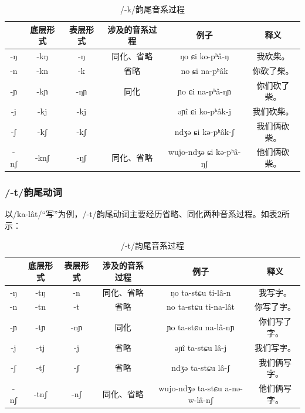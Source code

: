 \begin{table}[H]
\vspace{5pt}
    \centering
    \caption{/-k/韵尾音系过程}
    \label{kcodapro}
\begin{tabular}{c|ccccc}
\toprule
    & 底层形式 & 表层形式 & 涉及的音系过程 & 例子                      & 释义     \\
\midrule
-ŋ  & -kŋ     & -ŋ   & 同化、省略      & ŋo ɕi ko-pʰâ-ŋ         & 我砍柴。   \\
-n  & -kn     & -k   & 省略      & no ɕi na-pʰâk          & 你砍了柴。  \\
-ɲ  & -kɲ     & -ŋɲ  & 同化      & ɲo ɕi na-pʰâ-ŋɲ        & 你们砍了柴。 \\
-j  & -kj     & -kj  &         & əɲî ɕi ko-pʰâk-j      & 我们砍柴。  \\
-ʃ  & -kʃ     & -kʃ  &         & ndʒə ɕi kə-pʰâk-ʃ      & 我们俩砍柴。 \\
-nʃ & -knʃ    & -ŋʃ  & 同化、省略      & wujo-ndʒə ɕi kə-pʰâ-ŋʃ & 他们俩砍柴。\\
\bottomrule
\end{tabular}
\end{table}

\subsubsection{/-t/韵尾动词}

以/ka-lât/“写”为例，/-t/韵尾动词主要经历省略、同化两种音系过程。如表\ref{tcodapro}所示：

\begin{table}[H]
\vspace{5pt}
    \centering
    \caption{/-t/韵尾音系过程}
    \label{tcodapro}
\begin{tabular}{c|ccccc}
\toprule
    & 底层形式 & 表层形式 & 涉及的音系过程 & 例子                      & 释义     \\
\midrule
-ŋ  & -tŋ     & -n   & 同化、省略   & ŋo ta-stɕu ti-lâ-n             & 我写字。   \\
-n  & -tn     & -t   & 省略      & no ta-stɕu ti-na-lât           & 你写了字。  \\
-ɲ  & -tɲ     & -nɲ  & 同化      & ɲo ta-stɕu na-lâ-nɲ            & 你们写了字。 \\
-j  & -tj     & -j   & 省略      & əɲî ta-stɕu lâ-j              & 我们写字。  \\
-ʃ  & -tʃ     & -ʃ   & 省略      & ndʒə ta-stɕu lâ-ʃ              & 我们俩写字。 \\
-nʃ & -tnʃ    & -nʃ  & 同化、省略      & wujo-ndʒə ta-stɕu a-nə-w-lâ-nʃ & 他们俩写字。\\
\bottomrule
\end{tabular}
\end{table}

